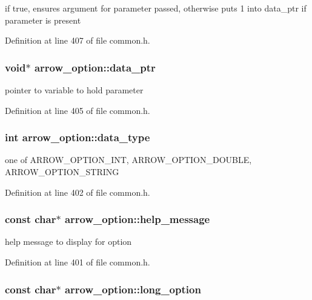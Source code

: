 if true, ensures argument for parameter passed, otherwise puts 1 into data\_\-ptr if parameter is present 

Definition at line 407 of file common.h.\hypertarget{structarrow__option_0b4e8cc50fdb7d8fbb1e63db30cd172d}{
\subsubsection[{data\_\-ptr}]{\setlength{\rightskip}{0pt plus 5cm}void$\ast$ {\bf arrow\_\-option::data\_\-ptr}}}
\label{structarrow__option_0b4e8cc50fdb7d8fbb1e63db30cd172d}


pointer to variable to hold parameter 

Definition at line 405 of file common.h.\hypertarget{structarrow__option_c97df040be0b7c76e92556087be21ff8}{
\subsubsection[{data\_\-type}]{\setlength{\rightskip}{0pt plus 5cm}int {\bf arrow\_\-option::data\_\-type}}}
\label{structarrow__option_c97df040be0b7c76e92556087be21ff8}


one of ARROW\_\-OPTION\_\-INT, ARROW\_\-OPTION\_\-DOUBLE, ARROW\_\-OPTION\_\-STRING 

Definition at line 402 of file common.h.\hypertarget{structarrow__option_48bfe5bda71cd04d92067b203ffb92ce}{
\subsubsection[{help\_\-message}]{\setlength{\rightskip}{0pt plus 5cm}const char$\ast$ {\bf arrow\_\-option::help\_\-message}}}
\label{structarrow__option_48bfe5bda71cd04d92067b203ffb92ce}


help message to display for option 

Definition at line 401 of file common.h.\hypertarget{structarrow__option_3d8ddc7b0d627a15c7108e21a16cb51a}{
\subsubsection[{long\_\-option}]{\setlength{\rightskip}{0pt plus 5cm}const char$\ast$ {\bf arrow\_\-option::long\_\-option}}}
\label{structarrow__option_3d8ddc7b0d627a15c7108e21a16cb51a}


